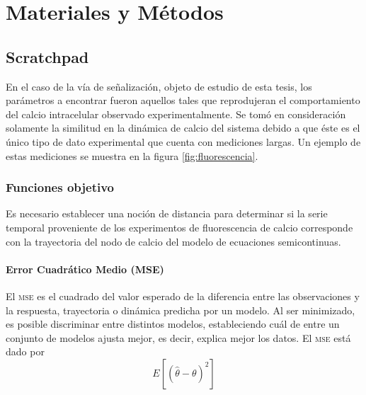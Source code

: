 \chapter{Materiales y M\'etodos}\label{ch:matmet} %

\section{Scratchpad}
En el caso de la vía de señalización, objeto de estudio de esta tesis, los parámetros a encontrar fueron aquellos tales que reprodujeran el comportamiento del calcio intracelular observado experimentalmente. Se tomó en consideración solamente la similitud en la dinámica de calcio del sistema debido a que éste es el único tipo de dato experimental que cuenta con mediciones largas. Un ejemplo de estas mediciones se muestra en la figura \ref{fig:fluorescencia}.


\subsection{Funciones objetivo}

Es necesario establecer una noción de distancia para determinar si la serie temporal proveniente de los experimentos de fluorescencia de calcio corresponde con la trayectoria del nodo de calcio del modelo de ecuaciones semicontinuas.

\subsubsection{Error Cuadrático Medio (MSE)}


El \textsc{mse} \citep{msewiki} es el cuadrado del valor esperado de la diferencia entre las observaciones y la respuesta, trayectoria o dinámica predicha por un modelo. Al ser minimizado, es posible discriminar entre distintos modelos, estableciendo cuál de entre un conjunto de modelos ajusta mejor, es decir, explica mejor los datos. El \textsc{mse} está dado por $$E[(\hat{\theta} - \theta)^2]$$

